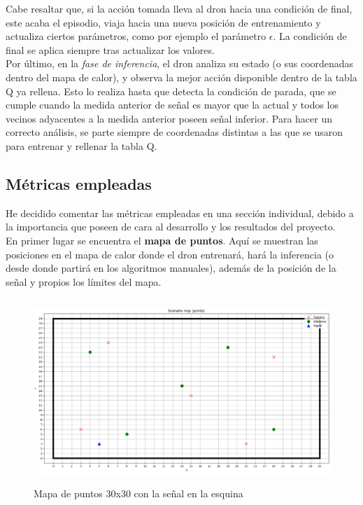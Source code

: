 Cabe resaltar que, si la acción tomada lleva al dron hacia una condición de final, este acaba el episodio, viaja hacia una nueva posición de entrenamiento y actualiza ciertos parámetros, como por ejemplo el parámetro $\epsilon$. La condición de final se aplica siempre tras actualizar los valores.\\

Por último, en la \emph{fase de inferencia}, el dron analiza su estado (o sus coordenadas dentro del mapa de calor), y observa la mejor acción disponible dentro de la tabla Q ya rellena. Esto lo realiza hasta que detecta la condición de parada, que se cumple cuando la medida anterior de señal es mayor que la actual y todos los vecinos adyacentes a la medida anterior poseen señal inferior. Para hacer un correcto análisis, se parte siempre de coordenadas distintas a las que se usaron para entrenar y rellenar la tabla Q.\\
\newpage
\subsection{Métricas empleadas}
\label{subsec:metricas}

He decidido comentar las métricas empleadas en una sección individual, debido a la importancia que poseen de cara al desarrollo y los resultados del proyecto.\\

En primer lugar se encuentra el \textbf{mapa de puntos}. Aquí se muestran las posiciones en el mapa de calor donde el dron entrenará, hará la inferencia (o desde donde partirá en los algoritmos manuales), además de la posición de la señal y propios los límites del mapa.\\

\begin{figure} [H]
    \begin{center}
    \includegraphics[height=7cm]{imagenes/cap4/12_puntos_30_esquina.png}
    \end{center}
    \caption[Mapa de puntos 30x30 con la señal en la esquina]{Mapa de puntos 30x30 con la señal en la esquina}
    \label{fig:30_points}
\end{figure}

